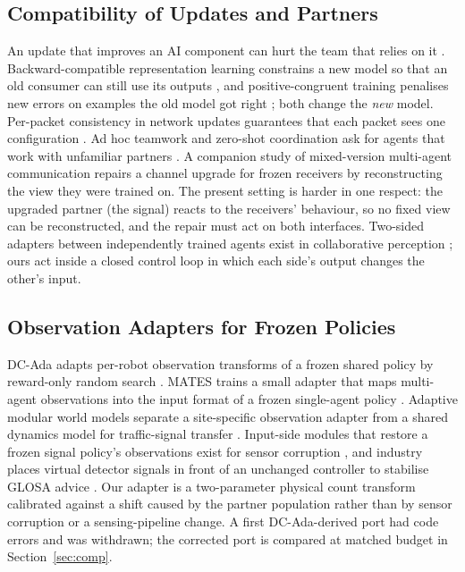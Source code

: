 \subsection{Compatibility of Updates and Partners}
An update that improves an AI component can hurt the team that relies on it \cite{bansal2019}. Backward-compatible representation
learning constrains a new model so that an old consumer can still use its outputs \cite{shen2020}, and positive-congruent training
penalises new errors on examples the old model got right \cite{yan2021}; both change the \emph{new} model. Per-packet consistency in
network updates guarantees that each packet sees one configuration \cite{reitblatt2012}. Ad hoc teamwork and zero-shot coordination ask
for agents that work with unfamiliar partners \cite{stone2010,hu2020}. A companion study of mixed-version multi-agent communication
\cite{nguyen2026legacy} repairs a channel upgrade for frozen receivers by reconstructing the view they were trained on. The present setting
is harder in one respect: the upgraded partner (the signal) reacts to the receivers' behaviour, so no fixed view can be reconstructed, and
the repair must act on both interfaces. Two-sided adapters between independently trained agents exist in collaborative perception
\cite{gao2025stamp}; ours act inside a closed control loop in which each side's output changes the other's input.

\subsection{Observation Adapters for Frozen Policies}
DC-Ada adapts per-robot observation transforms of a frozen shared policy by reward-only random search \cite{alqithami2026}. MATES
trains a small adapter that maps multi-agent observations into the input format of a frozen single-agent policy \cite{abboud2026mates}. Adaptive
modular world models separate a site-specific observation adapter from a shared dynamics model for traffic-signal transfer
\cite{huang2026}. Input-side modules that restore a frozen signal policy's observations exist for sensor corruption
\cite{li2025robustlight,li2026mdrc}, and industry places virtual detector signals in front of an unchanged controller to stabilise GLOSA
advice \cite{siemens2020ep}. Our adapter is a two-parameter physical count transform calibrated against a shift caused by the partner
population rather than by sensor corruption or a sensing-pipeline change. A first DC-Ada-derived port had code errors and was withdrawn; the corrected port is compared at matched budget in Section~\ref{sec:comp}.

